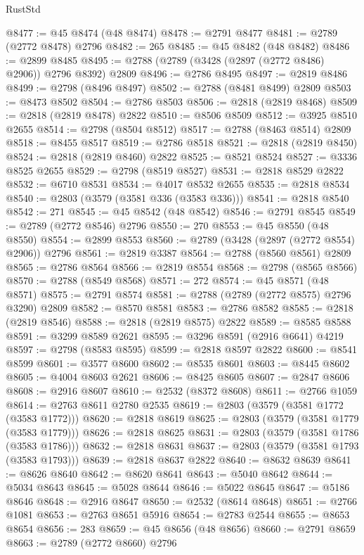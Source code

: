 \begin{lexlean}{RustStd}
\begin{coremodule}
@8477 := @45 @8474 (@48 @8474)
@8478 := @2791 @8477
@8481 := @2789 (@2772 @8478) @2796
@8482 := 265
@8485 := @45 @8482 (@48 @8482)
@8486 := @2899 @8485
@8495 := @2788 (@2789 (@3428 (@2897 (@2772 @8486) @2906)) @2796 @8392) @2809
@8496 := @2786 @8495
@8497 := @2819 @8486
@8499 := @2798 (@8496 @8497)
@8502 := @2788 (@8481 @8499) @2809
@8503 := @8473 @8502
@8504 := @2786 @8503
@8506 := @2818 (@2819 @8468)
@8509 := @2818 (@2819 @8478) @2822
@8510 := @8506 @8509
@8512 := @3925 @8510 @2655
@8514 := @2798 (@8504 @8512)
@8517 := @2788 (@8463 @8514) @2809
@8518 := @8455 @8517
@8519 := @2786 @8518
@8521 := @2818 (@2819 @8450)
@8524 := @2818 (@2819 @8460) @2822
@8525 := @8521 @8524
@8527 := @3336 @8525 @2655
@8529 := @2798 (@8519 @8527)
@8531 := @2818 @8529 @2822
@8532 := @6710 @8531
@8534 := @4017 @8532 @2655
@8535 := @2818 @8534
@8540 := @2803 (@3579 (@3581 @336 (@3583 @336)))
@8541 := @2818 @8540
@8542 := 271
@8545 := @45 @8542 (@48 @8542)
@8546 := @2791 @8545
@8549 := @2789 (@2772 @8546) @2796
@8550 := 270
@8553 := @45 @8550 (@48 @8550)
@8554 := @2899 @8553
@8560 := @2789 (@3428 (@2897 (@2772 @8554) @2906)) @2796
@8561 := @2819 @3387
@8564 := @2788 (@8560 @8561) @2809
@8565 := @2786 @8564
@8566 := @2819 @8554
@8568 := @2798 (@8565 @8566)
@8570 := @2788 (@8549 @8568)
@8571 := 272
@8574 := @45 @8571 (@48 @8571)
@8575 := @2791 @8574
@8581 := @2788 (@2789 (@2772 @8575) @2796 @3290) @2809
@8582 := @8570 @8581
@8583 := @2786 @8582
@8585 := @2818 (@2819 @8546)
@8588 := @2818 (@2819 @8575) @2822
@8589 := @8585 @8588
@8591 := @3299 @8589 @2621
@8595 := @3296 @8591 (@2916 @6641) @4219
@8597 := @2798 (@8583 @8595)
@8599 := @2818 @8597 @2822
@8600 := @8541 @8599
@8601 := @3577 @8600
@8602 := @8535 @8601
@8603 := @8445 @8602
@8605 := @4004 @8603 @2621
@8606 := @8425 @8605
@8607 := @2847 @8606
@8608 := @2916 @8607
@8610 := @2532 (@8372 @8608)
@8611 := @2766 @1059
@8614 := @2763 @8611 @2780 @2535
@8619 := @2803 (@3579 (@3581 @1772 (@3583 @1772)))
@8620 := @2818 @8619
@8625 := @2803 (@3579 (@3581 @1779 (@3583 @1779)))
@8626 := @2818 @8625
@8631 := @2803 (@3579 (@3581 @1786 (@3583 @1786)))
@8632 := @2818 @8631
@8637 := @2803 (@3579 (@3581 @1793 (@3583 @1793)))
@8639 := @2818 @8637 @2822
@8640 := @8632 @8639
@8641 := @8626 @8640
@8642 := @8620 @8641
@8643 := @5040 @8642
@8644 := @5034 @8643
@8645 := @5028 @8644
@8646 := @5022 @8645
@8647 := @5186 @8646
@8648 := @2916 @8647
@8650 := @2532 (@8614 @8648)
@8651 := @2766 @1081
@8653 := @2763 @8651 @5916
@8654 := @2783 @2544
@8655 := @8653 @8654
@8656 := 283
@8659 := @45 @8656 (@48 @8656)
@8660 := @2791 @8659
@8663 := @2789 (@2772 @8660) @2796

\end{coremodule}
\end{lexlean}
